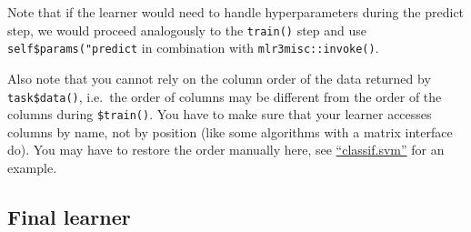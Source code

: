 \documentclass[
  11pt,
  parskip=half,
  DIV=calc,
  BCOR=10mm,
  x11names]{scrbook}
\newenvironment{Shaded}{}{}
\newcommand{\ControlFlowTok}[1]{\textcolor[rgb]{0.00,0.00,1.00}{#1}}
\newcommand{\DataTypeTok}[1]{#1}
\newcommand{\KeywordTok}[1]{\textcolor[rgb]{0.00,0.00,1.00}{#1}}
\newcommand{\NormalTok}[1]{#1}
\newcommand{\OperatorTok}[1]{#1}
\newcommand{\OtherTok}[1]{\textcolor[rgb]{1.00,0.25,0.00}{#1}}
\newcommand{\StringTok}[1]{\textcolor[rgb]{0.00,0.50,0.50}{#1}}
\begin{document}
\begin{Shaded}
\end{Shaded}

Note that if the learner would need to handle hyperparameters during the predict step, we would proceed analogously to the \texttt{train()} step and use \texttt{self\$params("predict} in combination with \texttt{mlr3misc::invoke()}.

Also note that you cannot rely on the column order of the data returned by \texttt{task\$data()}, i.e.~the order of columns may be different from the order of the columns during \texttt{\$train()}.
You have to make sure that your learner accesses columns by name, not by position (like some algorithms with a matrix interface do).
You may have to restore the order manually here, see \href{https://github.com/mlr-org/mlr3learners/blob/master/R/LearnerClassifSVM.R}{``classif.svm''} for an example.

\hypertarget{final-learner}{%
\subsection{Final learner}\label{final-learner}}
\end{document}
